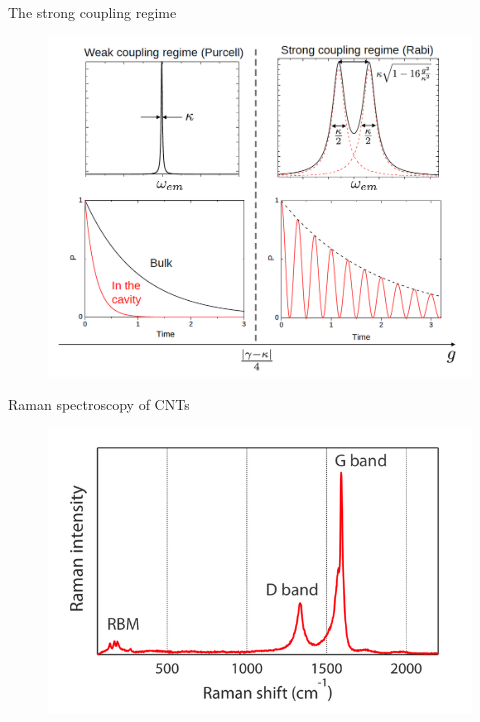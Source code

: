 \documentclass[xcolor = {dvipsnames}]{beamer}
\begin{document}
\begin{frame}{The strong coupling regime}
\begin{figure}
\centering
\includegraphics[width=.7\textwidth]{images/Rabi}
\end{figure}
\end{frame}

\begin{frame}{Raman spectroscopy of CNTs}
\begin{figure}
\centering
\includegraphics[width=.9\textwidth]{images/raman}
\end{figure}
\end{frame}
\end{document}
